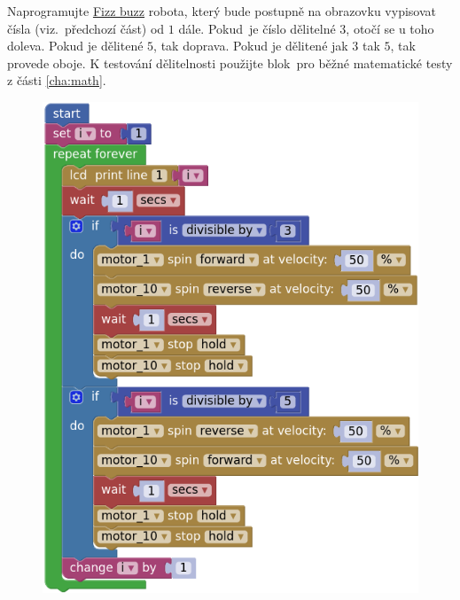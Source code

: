 \documentclass[../main.tex]{subfiles}
\begin{document}
	\begin{question*}
		Naprogramujte \href{https://en.wikipedia.org/wiki/Fizz\_buzz}{Fizz buzz} robota, který bude postupně na obrazovku vypisovat čísla (viz.~předchozí část) od $1$ dále. Pokud~je číslo dělitelné $3$, otočí se u toho doleva. Pokud je dělitené $5$, tak doprava. Pokud je dělitené jak $3$ tak $5$, tak provede oboje. K testování dělitelnosti použijte blok~pro běžné matematické testy z části \ref{cha:math}.
	\end{question*}

	\begin{solution}
		\begin{figure}
			\centering
			\begin{minipage}{0.4\textwidth}
				\includegraphics[width=\linewidth]{Images/05/solfb.png}
			\end{minipage}
		\end{figure}
	\end{solution}
\end{document}
